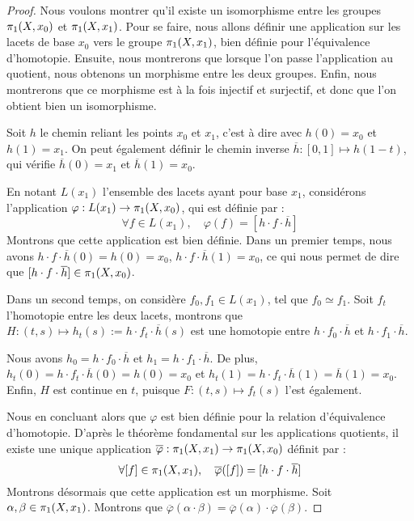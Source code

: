 \documentclass[hidelinks, 10pt]{article}
\begin{document}
\begin{proof}
Nous voulons montrer qu'il existe un isomorphisme entre les groupes $\pi_1(X,x_0)$ et $\pi_1(X,x_1)$. Pour se faire, nous allons définir une application sur les lacets de base $x_0$ vers le groupe $\pi_1(X,x_1)$, bien définie pour l'équivalence d'homotopie. Ensuite, nous montrerons que lorsque l'on passe l'application au quotient, nous obtenons un morphisme entre les deux groupes. Enfin, nous montrerons que ce morphisme est à la fois injectif et surjectif, et donc que l'on obtient bien un isomorphisme.

Soit $h$ le chemin reliant les points $x_0$ et $x_1$, c'est à dire avec $h(0)=x_0$ et $h(1)=x_1$. On peut également définir le chemin inverse $\overline{h}:[0,1]\mapsto h(1\!-\!t)$, qui vérifie $\overline{h}(0)=x_1$ et $\overline{h}(1)=x_0$.

En notant $L(x_1)$ l'ensemble des lacets ayant pour base $x_1$, considérons l'application $\varphi:L(x_1)\rightarrow\pi_1(X,x_0)$, qui est définie par : \[\forall f\in L(x_1),\quad \varphi(f)=[h\cdot f\cdot\overline{h}]\]Montrons que cette application est bien définie. Dans un premier temps, nous avons $h\cdot f\cdot\overline{h}(0)=h(0)=x_0$, $h\cdot f\cdot\overline{h}(1)=x_0$, ce qui nous permet de dire que $[h\cdot f\cdot\overline{h}]\in\pi_1(X,x_0)$. 

Dans un second temps, on considère $f_0,f_1\in L(x_1)$, tel que $f_0\simeq f_1$. Soit $f_t$ l'homotopie entre les deux lacets, montrons que $H:(t,s)\mapsto h_t(s):=h\cdot f_t\cdot\overline{h}(s)$ est une homotopie entre $h\cdot f_0\cdot\overline{h}$ et $h\cdot f_1\cdot\overline{h}$.

Nous avons $h_0=h\cdot f_0\cdot\overline{h}$ et $h_1=h\cdot f_1\cdot\overline{h}$. De plus, $h_t(0)=h\cdot f_t\cdot\overline{h}(0)=h(0)=x_0$ et $h_t(1)=h\cdot f_t\cdot\overline{h}(1)=\overline{h}(1)=x_0$. Enfin, $H$ est continue en $t$, puisque $F:(t,s)\mapsto f_t(s)$ l'est également.

Nous en concluant alors que $\varphi$ est bien définie pour la relation d'équivalence d'homotopie. D'après le théorème fondamental sur les applications quotients, il existe une unique application $\overline{\varphi}:\pi_1(X,x_1)\rightarrow\pi_1(X,x_0)$ définit par : \[\forall [f]\in \pi_1(X,x_1),\quad \overline{\varphi}([f])=[h\cdot f\cdot\overline{h}]\]Montrons désormais que cette application est un morphisme. Soit $\alpha,\beta\in\pi_1(X,x_1)$. Montrons que $\overline{\varphi}(\alpha\cdot\beta)=\overline{\varphi}(\alpha)\cdot\overline{\varphi}(\beta)$.


\end{proof}
\end{document}
